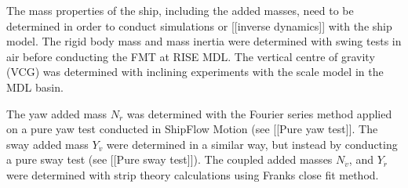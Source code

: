 The mass properties of the ship, including the added masses, need to be determined in order to conduct simulations or [[inverse dynamics]] with the ship model. The rigid body mass and mass inertia were determined with swing tests in air before conducting the FMT at RISE MDL. The vertical centre of gravity (VCG) was determined with inclining experiments with the scale model in the MDL basin.

The yaw added mass $N_{\dot{r}}$ was determined with the Fourier series method applied on a pure yaw test conducted in ShipFlow Motion (see [[Pure yaw test]]. The sway added mass $Y_{\dot{v}}$ were determined in a similar way, but instead by conducting a pure sway test (see [[Pure sway test]]). The coupled added masses $N_{\dot{v}}$, and $Y_{\dot{r}}$ were determined with strip theory calculations using Franks close fit method.